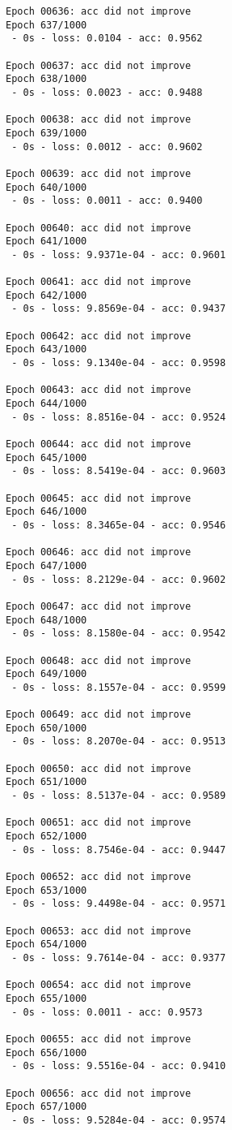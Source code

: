 \documentclass[11pt]{article}
\begin{document}
\begin{Verbatim}[commandchars=\\\{\}]
Epoch 00636: acc did not improve
Epoch 637/1000
 - 0s - loss: 0.0104 - acc: 0.9562

Epoch 00637: acc did not improve
Epoch 638/1000
 - 0s - loss: 0.0023 - acc: 0.9488

Epoch 00638: acc did not improve
Epoch 639/1000
 - 0s - loss: 0.0012 - acc: 0.9602

Epoch 00639: acc did not improve
Epoch 640/1000
 - 0s - loss: 0.0011 - acc: 0.9400

Epoch 00640: acc did not improve
Epoch 641/1000
 - 0s - loss: 9.9371e-04 - acc: 0.9601

Epoch 00641: acc did not improve
Epoch 642/1000
 - 0s - loss: 9.8569e-04 - acc: 0.9437

Epoch 00642: acc did not improve
Epoch 643/1000
 - 0s - loss: 9.1340e-04 - acc: 0.9598

Epoch 00643: acc did not improve
Epoch 644/1000
 - 0s - loss: 8.8516e-04 - acc: 0.9524

Epoch 00644: acc did not improve
Epoch 645/1000
 - 0s - loss: 8.5419e-04 - acc: 0.9603

Epoch 00645: acc did not improve
Epoch 646/1000
 - 0s - loss: 8.3465e-04 - acc: 0.9546

Epoch 00646: acc did not improve
Epoch 647/1000
 - 0s - loss: 8.2129e-04 - acc: 0.9602

Epoch 00647: acc did not improve
Epoch 648/1000
 - 0s - loss: 8.1580e-04 - acc: 0.9542

Epoch 00648: acc did not improve
Epoch 649/1000
 - 0s - loss: 8.1557e-04 - acc: 0.9599

Epoch 00649: acc did not improve
Epoch 650/1000
 - 0s - loss: 8.2070e-04 - acc: 0.9513

Epoch 00650: acc did not improve
Epoch 651/1000
 - 0s - loss: 8.5137e-04 - acc: 0.9589

Epoch 00651: acc did not improve
Epoch 652/1000
 - 0s - loss: 8.7546e-04 - acc: 0.9447

Epoch 00652: acc did not improve
Epoch 653/1000
 - 0s - loss: 9.4498e-04 - acc: 0.9571

Epoch 00653: acc did not improve
Epoch 654/1000
 - 0s - loss: 9.7614e-04 - acc: 0.9377

Epoch 00654: acc did not improve
Epoch 655/1000
 - 0s - loss: 0.0011 - acc: 0.9573

Epoch 00655: acc did not improve
Epoch 656/1000
 - 0s - loss: 9.5516e-04 - acc: 0.9410

Epoch 00656: acc did not improve
Epoch 657/1000
 - 0s - loss: 9.5284e-04 - acc: 0.9574


\end{Verbatim}
\end{document}
